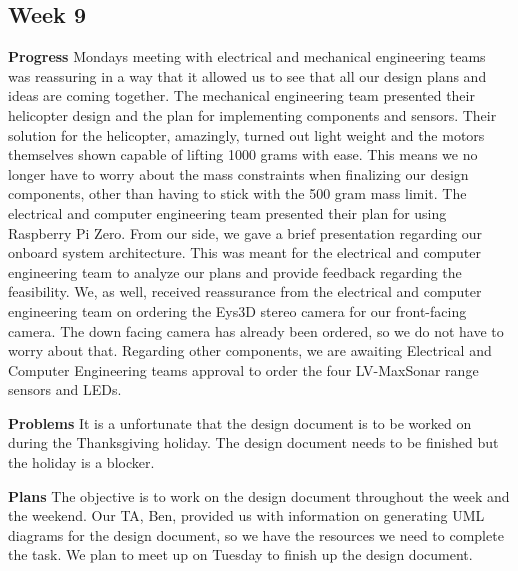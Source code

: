 \documentclass[onecolumn, oneside, letterpaper, draftclsnofoot, 10pt, compsoc]{IEEEtran}
\begin{document}
\subsection{Week 9}
\noindent \textbf{Progress} \newline \noindent
Monday\textquotesingle s meeting with electrical and mechanical engineering teams was reassuring in a way that it allowed us to see that all our design plans and ideas are coming together. The mechanical engineering team presented their helicopter design and the plan for implementing components and sensors. Their solution for the helicopter, amazingly, turned out light weight and the motors themselves shown capable of lifting 1000 grams with ease. This means we no longer have to worry about the mass constraints when finalizing our design components, other than having to stick with the 500 gram mass limit. The electrical and computer engineering team presented their plan for using Raspberry Pi Zero. From our side, we gave a brief presentation regarding our onboard system architecture. This was meant for the electrical and computer engineering team to analyze our plans and provide feedback regarding the feasibility. We, as well, received reassurance from the electrical and computer engineering team on ordering the Eys3D stereo camera for our front-facing camera. The down facing camera has already been ordered, so we do not have to worry about that. Regarding other components, we are awaiting Electrical and Computer Engineering team\textquotesingle s approval to order the four LV-MaxSonar range sensors and LEDs.

\noindent \textbf{Problems} \newline \noindent
It is a unfortunate that the design document is to be worked on during the Thanksgiving holiday. The design document needs to be finished but the holiday is a blocker.

\noindent \textbf{Plans} \newline \noindent
The objective is to work on the design document throughout the week and the weekend. Our TA, Ben, provided us with information on generating UML diagrams for the design document, so we have the resources we need to complete the task. We plan to meet up on Tuesday to finish up the design document.

\clearpage
\end{document}
